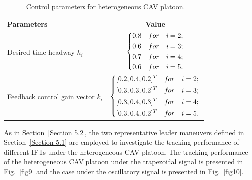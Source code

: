 \documentclass[a4paper]{cas-sc}
\begin{document}
\begin{table}
  \centering
  \setlength{\abovecaptionskip}{0pt}
  \setlength{\belowcaptionskip}{10pt}%
  \begin{threeparttable}[b]

    \caption{~Control parameters for heterogeneous CAV platoon.}
    \label{table2}
    {\begin{tabular}{lc} \toprule
        Parameters                             & Value                                           \\ \midrule
        Desired time headway $h_i$             & $
        \left\{ \begin{gathered}
            0.8\quad for\quad i = 2; \hfill \\
            0.6\quad for\quad i = 3; \hfill \\
            0.7\quad for\quad i = 4; \hfill \\
            0.6\quad for\quad i = 5. \hfill \\
          \end{gathered}  \right. $                                            \\
        Feedback control gain vector $ {k_i} $ & $ \left\{ \begin{gathered}
            {[0.2,0.4,0.2]^T}\quad for\quad i = 2; \hfill \\
            {[0.3,0.3,0.2]^T}\quad for\quad i = 3; \hfill \\
            {[0.3,0.4,0.3]^T}\quad for\quad i = 4; \hfill \\
            {[0.3,0.4,0.2]^T}\quad for\quad i = 5. \hfill \\
          \end{gathered}  \right. $ \\
        \bottomrule
      \end{tabular}}
  \end{threeparttable}
\end{table}

As in Section~\ref{Section 5.2}, the two representative leader maneuvers defined in Section~\ref{Section 5.1} are employed to investigate the tracking performance of different IFTs under the heterogeneous CAV platoon. The tracking performance of the heterogeneous CAV platoon under the trapezoidal signal is presented in Fig.~\ref{fig9} and the case under the oscillatory signal is presented in Fig.~\ref{fig10}.
\end{document}
